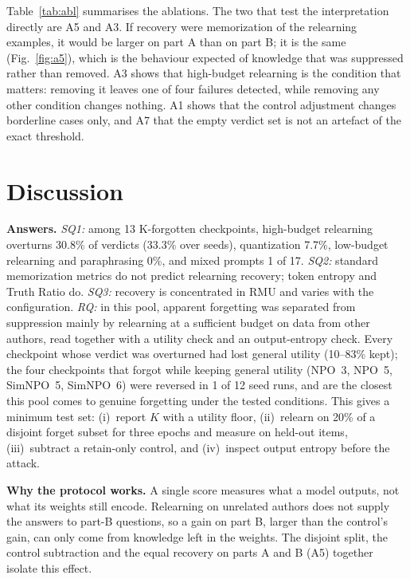 \documentclass[conference]{IEEEtran}
\begin{document}
Table~\ref{tab:abl} summarises the ablations. The two that test the interpretation directly are A5 and A3. If recovery were memorization of the relearning examples, it would be larger on part A than on part B; it is the same (Fig.~\ref{fig:a5}), which is the behaviour expected of knowledge that was suppressed rather than removed. A3 shows that high-budget relearning is the condition that matters: removing it leaves one of four failures detected, while removing any other condition changes nothing. A1 shows that the control adjustment changes borderline cases only, and A7 that the empty verdict set is not an artefact of the exact threshold.

\section{Discussion}\label{sec:discussion}
\textbf{Answers.} \emph{SQ1:} among 13 K-forgotten checkpoints, high-budget relearning overturns 30.8\% of verdicts (33.3\% over seeds), quantization 7.7\%, low-budget relearning and paraphrasing 0\%, and mixed prompts 1 of 17. \emph{SQ2:} standard memorization metrics do not predict relearning recovery; token entropy and Truth Ratio do. \emph{SQ3:} recovery is concentrated in RMU and varies with the configuration. \emph{RQ:} in this pool, apparent forgetting was separated from suppression mainly by relearning at a sufficient budget on data from other authors, read together with a utility check and an output-entropy check. Every checkpoint whose verdict was overturned had lost general utility (10--83\% kept); the four checkpoints that forgot while keeping general utility (NPO~3, NPO~5, SimNPO~5, SimNPO~6) were reversed in 1 of 12 seed runs, and are the closest this pool comes to genuine forgetting under the tested conditions. This gives a minimum test set: (i)~report $K$ with a utility floor, (ii)~relearn on 20\% of a disjoint forget subset for three epochs and measure on held-out items, (iii)~subtract a retain-only control, and (iv)~inspect output entropy before the attack.

\textbf{Why the protocol works.} A single score measures what a model outputs, not what its weights still encode. Relearning on unrelated authors does not supply the answers to part-B questions, so a gain on part B, larger than the control's gain, can only come from knowledge left in the weights. The disjoint split, the control subtraction and the equal recovery on parts A and B (A5) together isolate this effect.
\end{document}
